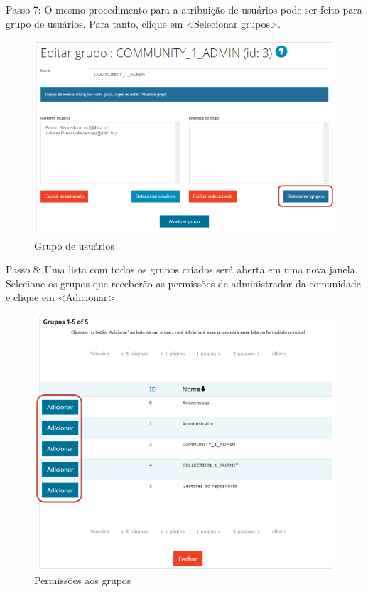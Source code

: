 \documentclass[12pt,hidelinks]{article}
\begin{document}
    Passo 7: O mesmo procedimento para a atribuição de usuários pode ser feito para grupo de usuários. Para tanto, clique em <Selecionar grupos>.
    
    \begin{figure}[!htp]
                \centering
                \includegraphics[scale=0.7]{figura/Figura24.png}
                \caption{Grupo de usuários}
            \label{Rotulo}
        \end{figure}

\newpage
    Passo 8: Uma lista com todos os grupos criados será aberta em uma nova janela. Selecione os grupos que receberão as permissões de administrador da comunidade e clique em <Adicionar>.
    
    \begin{figure}[!htp]
                \centering
                \includegraphics[scale=0.7]{figura/Figura25.png}
                \caption{Permissões aos grupos}
            \label{Rotulo}
        \end{figure}
    
\end{document}
